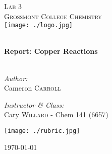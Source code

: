 \begin{titlepage}
\begin{center}

\textsc{\Large Lab 3}\\[1.5cm]
\textsc{\Large Grossmont College Chemistry}\\[0.5cm]
\texttt{[image: ./logo.jpg]}

\HRule \\[0.4cm]
{ \LARGE \bfseries Report: Copper Reactions}\\[0.5cm]

\HRule \\[1.5cm]

\begin{minipage}{0.4\textwidth}
\begin{flushleft} \large
\emph{Author:}\\
Cameron \textsc{Carroll}\\[0.2cm]

\end{flushleft}
\end{minipage}
\begin{minipage}{0.4\textwidth}
\begin{flushright} \large
\emph{Instructor \& Class:}\\
Cary \textsc{Willard} - Chem 141 (6657)
\end{flushright}
\end{minipage}

\texttt{[image: ./rubric.jpg]}

\vfill

{\large \today}

\end{center}
\end{titlepage}